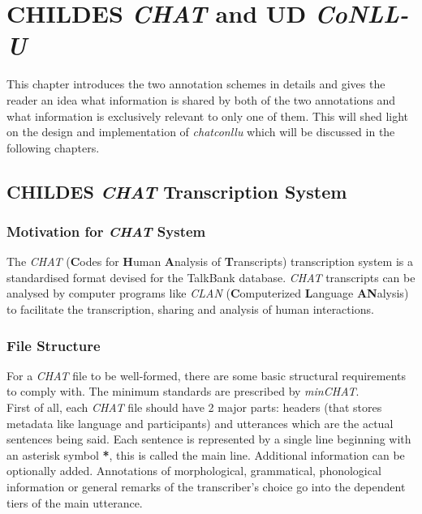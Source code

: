 \chapter{CHILDES \emph{CHAT} and UD \emph{CoNLL-U}} %

\label{Chapter2} %

This chapter introduces the two annotation schemes in details and gives the
reader an idea what information is shared by both of the two annotations and
what information is exclusively relevant to only one of them. This will shed
light on the design and implementation of \emph{chatconllu} which will be
discussed in the following chapters.

\section{CHILDES \emph{CHAT} Transcription System}
\subsection{Motivation for \emph{CHAT} System}
The \emph{CHAT} (\textbf{C}odes for \textbf{H}uman \textbf{A}nalysis of
\textbf{T}ranscripts) transcription system \cite{Macwhinney2000} is a
standardised format devised for the TalkBank database. \emph{CHAT} transcripts
can be analysed by computer programs like \emph{CLAN} (\textbf{C}omputerized
\textbf{L}anguage \textbf{AN}alysis) to facilitate the transcription, sharing
and analysis of human interactions.

\subsection{File Structure}
For a \emph{CHAT} file to be well-formed, there are some basic structural
requirements to comply with. The minimum standards are prescribed by
\emph{minCHAT}.\\
First of all, each \emph{CHAT} file should have 2 major parts: headers (that
stores metadata like language and participants) and utterances which are the
actual sentences being said. Each sentence is represented by a single line
beginning with an asterisk symbol \textbf{*}, this is called the main line.
Additional information can be optionally added. Annotations of morphological,
grammatical, phonological information or general remarks of the transcriber's
choice go into the dependent tiers of the main utterance.

